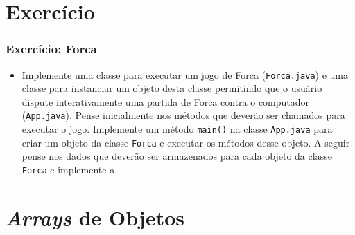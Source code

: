 \documentclass[xcolor={dvipsnames,table},aspectratio=169]{beamer}
\begin{document}
\section{Exercício}

\begin{frame}[fragile]\frametitle{Exercício: Forca}
\begin{itemize}
	\item Implemente uma classe para executar um jogo de Forca (\texttt{Forca.java}) e uma classe para instanciar um objeto desta classe permitindo que o usuário dispute interativamente uma partida de Forca contra o computador (\texttt{App.java}). Pense inicialmente nos métodos que deverão ser chamados para executar o jogo. Implemente um método \texttt{main()} na classe \texttt{App.java} para criar um objeto da classe \texttt{Forca} e executar os métodos desse objeto. A seguir pense nos dados que deverão ser armazenados para cada objeto da classe \texttt{Forca} e implemente-a.
\end{itemize}
\end{frame}

\section{\emph{Arrays} de Objetos}
\end{document}
